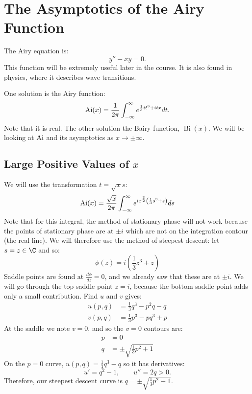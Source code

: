 \documentclass[../Main.tex]{subfiles}
\begin{document}
\section{The Asymptotics of the Airy Function}
The Airy equation is:
\begin{equation}
    y'' - xy = 0.
    \label{eqnAiry}
\end{equation}
This function will be extremely useful later in the course. It is also found in physics, where it describes wave transitions.

One solution is the Airy function:
\begin{equation*}
    \operatorname{Ai}(x) = \frac{1}{2\pi} \int_{-\infty}^{\infty} e^{\frac13 it^3 + itx} dt.
\end{equation*}
Note that it is real. The other solution the Bairy function, $\operatorname{Bi}(x)$. We will be looking at $\operatorname{Ai}$ and its asymptotics as $x \to \pm \infty$.
\subsection{Large Positive Values of \texorpdfstring{$x$}{the Parameter}}
We will use the transformation $t = \sqrt{x} s$:
\begin{equation*}
    \operatorname{Ai}(x) = \frac{\sqrt{x}}{2\pi} \int_{-\infty}^{\infty} e^{ix^{\frac32}\left(\frac13 s^3 + s\right)} ds 
\end{equation*}
Note that for this integral, the method of stationary phase will not work because the points of stationary phase are at $\pm i$ which are not on the integration contour (the real line). We will therefore use the method of steepest descent: let $s = z \in \C$ and so:
\begin{equation*}
    \phi(z) = i\left(\frac13 z^3 + z\right)
\end{equation*}
Saddle points are found at $\frac{d\phi}{dz} = 0$, and we already saw that these are at $\pm i$. We will go through the top saddle point $z = i$, because the bottom saddle point adds only a small contribution. Find $u$ and $v$ gives:
\begin{align*}
    u(p, q) &= \frac13 q^3 - p^2 q - q \\
    v(p, q) &= \frac13 p^3 - pq^3 + p
\end{align*}
At the saddle we note $v = 0$, and so the $v = 0$ contours are:
\begin{align*}
    p &= 0 \\
    q &= \pm \sqrt{\frac13 p^2 + 1}
\end{align*}
On the $p = 0$ curve, $u(p, q) = \frac13 q^3 - q$ so it has derivatives:
\begin{equation*}
    u' = q^2 - 1,\qquad u'' = 2q > 0.
\end{equation*}
Therefore, our steepest descent curve is $q = \pm \sqrt{\frac13 p^2 + 1}$.
\end{document}
